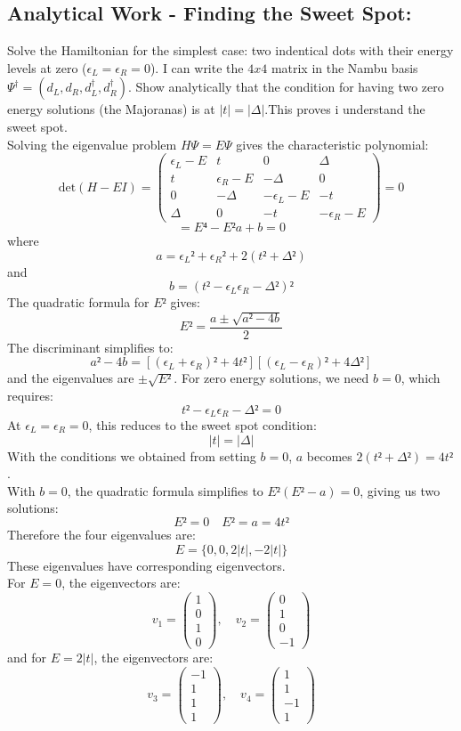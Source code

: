 \documentclass[11pt, letterpaper, titlepage]{article}
\begin{document}
\subsection{Analytical Work - Finding the Sweet Spot:} Solve the Hamiltonian for the simplest case: two indentical dots with their energy levels at zero ($ϵ_L = ϵ_R = 0$). I can write the $4x4$ matrix in the Nambu basis $Ψ^{†}= (d_L, d_R, d_L^{†}, d_R^{†})$. Show analytically that the condition for having two zero energy solutions (the Majoranas) is at $|t| = |Δ|$.This proves i understand the sweet spot.\\ 

Solving the eigenvalue problem $HΨ = EΨ$ gives the characteristic polynomial:
$$
\text{det}(H - EI) = \begin{pmatrix}
    ϵ_L-E & t & 0 & Δ \\
    t & ϵ_R-E & -Δ & 0 \\
    0 & -Δ & -ϵ_L-E & -t \\
    Δ & 0 & -t & -ϵ_R-E
\end{pmatrix} =0
$$
$$
= E⁴ -E²a + b=0
$$
where
$$
a = ϵ_L² + ϵ_R² + 2(t² + Δ²)
$$
and 
$$
b = (t² - ϵ_Lϵ_R - Δ²)² 
$$
The quadratic formula for $E²$ gives:
$$
E² = \frac{a ± \sqrt{a² - 4b}}{2}
$$
The discriminant simplifies to:
$$
a² - 4b = [(ϵ_L+ϵ_R)² + 4t²][(ϵ_L - ϵ_R)² + 4Δ²]
$$
and the eigenvalues are $±\sqrt{E²}$. For zero energy solutions, we need $b=0$, which requires:
$$
t² - ϵ_Lϵ_R - Δ² = 0
$$
At $ϵ_L = ϵ_R = 0$, this reduces to the sweet spot condition:
$$|t| = |Δ|$$
With the conditions we obtained from setting $b=0$, $a$ becomes $2(t² + Δ²)=4t²$.\\
With $b=0$, the quadratic formula simplifies to $E²(E²-a)=0$, giving us two solutions:
$$
E² = 0 \quad E² = a = 4t²
$$
Therefore the four eigenvalues are:
$$
E = \{0, 0, 2|t|, -2|t|\}
$$
These eigenvalues have corresponding eigenvectors. \\
For $E=0$, the eigenvectors are:
$$
v_1 =  \begin{pmatrix} 1 \\ 0 \\ 1 \\ 0 \end{pmatrix}, \quad v_2 = \begin{pmatrix} 0 \\ 1 \\ 0 \\ -1 \end{pmatrix}
$$
and for $E=2|t|$, the eigenvectors are:
$$
v_3 =  \begin{pmatrix} -1 \\ 1 \\ 1 \\ 1 \end{pmatrix}, \quad v_4 = \begin{pmatrix} 1\\ 1 \\ -1 \\ 1\end{pmatrix}
$$
\end{document}
